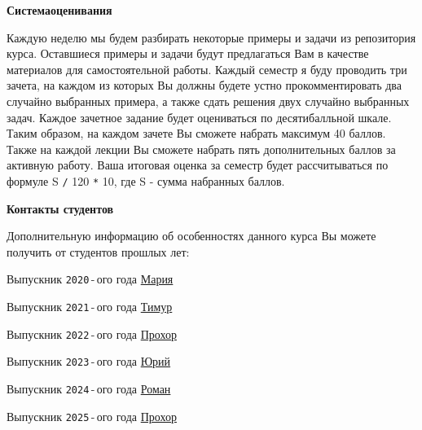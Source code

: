 \documentclass[a4paper,12pt]{article}
\renewenvironment{itemize}
{
    \begin{list}{\labelitemi}
    {
      \setlength{\topsep}{0pt}
      \setlength{\partopsep}{0pt}
      \setlength{\parskip}{0pt}
      \setlength{\itemsep}{0pt}
      \setlength{\parsep}{0pt}
      \setlength{\leftmargin}{14.5pt}
    }
}{\end{list}}
\begin{document}
\medskip
\medskip

\textbf{Система\:оценивания}

\medskip

Каждую неделю мы будем разбирать некоторые примеры и задачи из репозитория курса. Оставшиеся примеры и задачи будут предлагаться Вам в качестве материалов для самостоятельной работы. Каждый семестр я буду проводить три зачета, на каждом из которых Вы должны будете устно прокомментировать два случайно выбранных примера, а также сдать решения двух случайно выбранных задач. Каждое зачетное задание будет оцениваться по десятибалльной шкале. Таким образом, на каждом зачете Вы сможете набрать максимум 40 баллов. Также на каждой лекции Вы сможете набрать пять дополнительных баллов за активную работу. Ваша итоговая оценка за семестр будет рассчитываться по формуле S \texttt{/} 120 \texttt{*} 10, где S - сумма набранных баллов.

\medskip
\medskip

\textbf{Контакты студентов}

\medskip

Дополнительную информацию об особенностях данного курса Вы можете получить от студентов прошлых лет:

\medskip

\begin{itemize}

    \item Выпускник \texttt{2020}\,-\,ого года \href{https://t.me/makovka2000}{Мария}

    \smallskip

    \item Выпускник \texttt{2021}\,-\,ого года \href{https://t.me/TF0801}{Тимур}

    \smallskip

    \item Выпускник \texttt{2022}\,-\,ого года \href{https://t.me/Funny_ded}{Прохор}

    \smallskip

    \item Выпускник \texttt{2023}\,-\,ого года \href{https://t.me/YuriKashpur}{Юрий}

    \smallskip

    \item Выпускник \texttt{2024}\,-\,ого года \href{https://t.me/Yeah_That_Fits}{Роман} 

    \smallskip

    \item Выпускник \texttt{2025}\,-\,ого года \href{https://t.me/Funny_ded}{Прохор}

\end{itemize}
\end{document}
